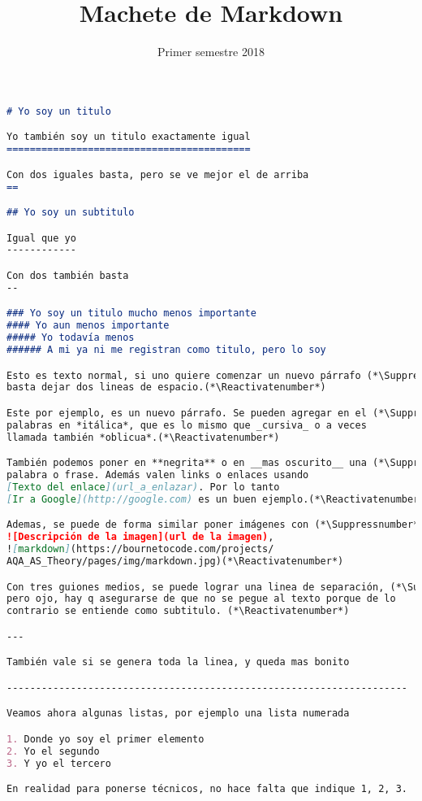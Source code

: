 \documentclass[12pt, addpoints]{../../common/epyl_exam_template}
\title{Machete de Markdown}
\date{Primer semestre 2018}
\begin{document}
    \makeexamheader
    \makeexamtitle
    \examrule

    \begin{lstlisting}[language=markdown]
# Yo soy un titulo

Yo también soy un titulo exactamente igual
==========================================

Con dos iguales basta, pero se ve mejor el de arriba
==

## Yo soy un subtitulo

Igual que yo
------------

Con dos también basta
--

### Yo soy un titulo mucho menos importante
#### Yo aun menos importante
##### Yo todavía menos
###### A mi ya ni me registran como titulo, pero lo soy

Esto es texto normal, si uno quiere comenzar un nuevo párrafo (*\Suppressnumber*)
basta dejar dos lineas de espacio.(*\Reactivatenumber*)

Este por ejemplo, es un nuevo párrafo. Se pueden agregar en el (*\Suppressnumber*)
palabras en *itálica*, que es lo mismo que _cursiva_ o a veces
llamada también *oblicua*.(*\Reactivatenumber*)

También podemos poner en **negrita** o en __mas oscurito__ una (*\Suppressnumber*)
palabra o frase. Además valen links o enlaces usando
[Texto del enlace](url_a_enlazar). Por lo tanto
[Ir a Google](http://google.com) es un buen ejemplo.(*\Reactivatenumber*)

Ademas, se puede de forma similar poner imágenes con (*\Suppressnumber*)
![Descripción de la imagen](url de la imagen),
![markdown](https://bournetocode.com/projects/
AQA_AS_Theory/pages/img/markdown.jpg)(*\Reactivatenumber*)

Con tres guiones medios, se puede lograr una linea de separación, (*\Suppressnumber*)
pero ojo, hay q asegurarse de que no se pegue al texto porque de lo
contrario se entiende como subtitulo. (*\Reactivatenumber*)

---

También vale si se genera toda la linea, y queda mas bonito

---------------------------------------------------------------------

Veamos ahora algunas listas, por ejemplo una lista numerada

1. Donde yo soy el primer elemento
2. Yo el segundo
3. Y yo el tercero

En realidad para ponerse técnicos, no hace falta que indique 1, 2, 3.


\end{lstlisting}
\end{document}
